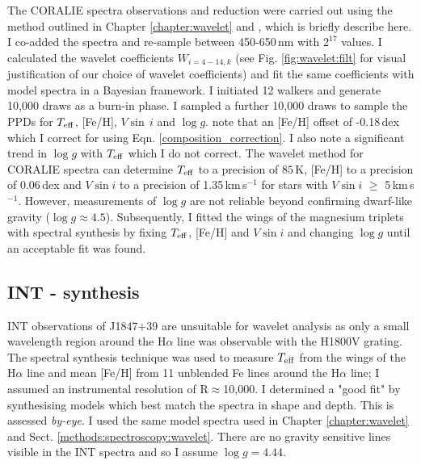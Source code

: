The CORALIE spectra observations and reduction were carried out using the method outlined in Chapter \ref{chapter:wavelet} and \citet{2018A&A...612A.111G}, which is briefly describe here. I co-added the spectra and re-sample between 450-650\,nm with $2^{17}$ values. I calculated the wavelet coefficients $W_{i=4-14, k}$ (see Fig. \ref{fig:wavelet:filt} for visual justification of our choice of wavelet coefficients) and fit the same coefficients with model spectra in a Bayesian framework. I initiated 12 walkers and generate 10,000 draws as a burn-in phase. I sampled a further 10,000 draws to sample the PPDs for $T_{\rm eff}$, [Fe/H], $V\sin\,i$ and $\log g$. \citet{2018A&A...612A.111G} note that an [Fe/H] offset of -0.18\,dex which I correct for using Eqn. \ref{composition_correction}. I also note a  significant trend in $\log g$ with $T_{\rm eff}$ which I do not correct. The wavelet method for CORALIE spectra can determine $T_{\rm eff}$ to a precision of $85$\,K, [Fe/H] to a precision of 0.06\,dex and $V \sin i$ to a precision of 1.35\,km\,s$^{-1}$ for stars with $V \sin i$ $\geq$ 5\,km\,s$^{-1}$. However, measurements of $\log g$ are not reliable beyond confirming dwarf-like gravity ($\log g \approx 4.5$). Subsequently, I fitted the wings of the magnesium triplets with spectral synthesis by fixing $T_{\rm eff}$, [Fe/H] and $V\sin i$ and changing $\log g$ until an acceptable fit was found. 

\subsection{INT - synthesis}

INT observations of J1847$+$39 are unsuitable for wavelet analysis as only a small wavelength region around the H$\alpha$ line was observable with the H1800V grating.  The spectral synthesis technique was used to measure $T_{\rm eff}$ from the wings of the H$\alpha$ line and mean [Fe/H] from 11 unblended Fe lines around the H$\alpha$ line; I assumed an instrumental resolution of R$\approx$10,000. I determined a "good fit" by synthesising models which best match the spectra in shape and depth. This is assessed \textit{by-eye}.  I used the same model spectra used in Chapter \ref{chapter:wavelet} and Sect. \ref{methods:spectroscopy:wavelet}. There are no gravity sensitive lines visible in the INT spectra and so I assume $\log g = 4.44$. %


